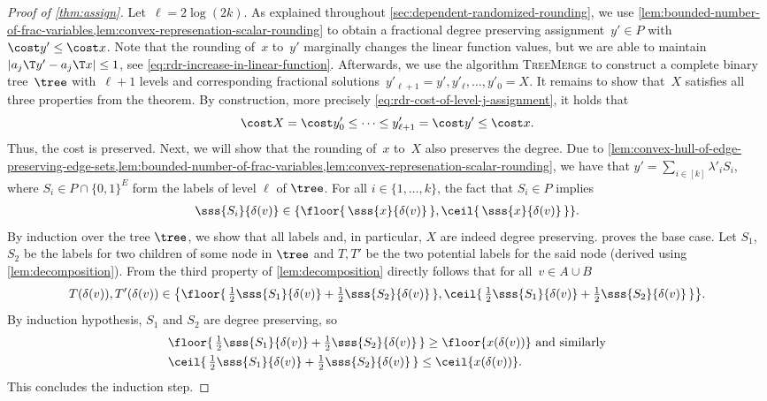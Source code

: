 \begin{proof}[Proof of \cref{thm:assign}]
    Let~$\ell = 2 \log (2k)$.
    As explained throughout \cref{sec:dependent-randomized-rounding}, we use \cref{lem:bounded-number-of-frac-variables,lem:convex-represenation-scalar-rounding} to obtain a fractional degree preserving assignment~$y'\in P$ with
    $\cost y'\le \cost x$.
    Note that the rounding of~$x$ to~$y'$ marginally changes the linear function values, but we are able to maintain~$|a_j\T y' - a_j\T x|\le 1$, see \cref{eq:rdr-increase-in-linear-function}.
    Afterwards, we use the algorithm \textsc{TreeMerge} to construct a complete binary tree~$\tree$ with~$\ell + 1$ levels
    and corresponding fractional solutions~$y'_{\ell+1} = y', y'_{\ell}, \dotsc, y'_0 = X$.
    It remains to show that~$X$ satisfies all three properties from the theorem.
    By construction, more precisely \cref{eq:rdr-cost-of-level-j-assignment}, it
    holds that
    \begin{equation*}
        \cost X = \cost y_0' \le \cdots \le y'_{\ell+1} = \cost y' \le \cost x.
    \end{equation*}
    Thus, the cost is preserved.
    Next, we will show that the rounding of~$x$ to~$X$ also preserves the degree.
    Due to \cref{lem:convex-hull-of-edge-preserving-edge-sets,lem:bounded-number-of-frac-variables,lem:convex-represenation-scalar-rounding},
    we have that $y' = \sum_{i \in [k]} \lambda'_i S_i$, where $S_i\in P\cap \{0,1\}^E$
    form the labels of level $\ell$ of $\tree$. For all $i\in\{1,\dotsc,k\}$,
    the fact that $S_i\in P$ implies
    \begin{align}
        \label{eq:rdr-degree-preservation}
        \sss{S_i}{\delta(v)} \in \{ \floor{\,\sss{x}{\delta(v)}\,}, \ceil{\, \sss{x}{\delta(v)}\,} \}.
    \end{align}
    By induction over the tree $\tree$, we show that all labels and, in particular, $X$ are indeed degree preserving.  proves the base case.
    Let $S_1$, $S_2$ be the labels for two children of some node in $\tree$
    and $T, T'$ be the two potential labels for the said node (derived using \cref{lem:decomposition}).
    From the third property of \cref{lem:decomposition} directly follows that for all~$v \in A \cup B$ 
    \begin{equation}
        \label{eq:rdr-degree-preservation-of-edge-decomposition}
        T(\delta(v)), T'(\delta(v))
        \in \big\{\floor{ \,\tfrac{1}{2}  \sss{S_{1}}{\delta(v)} + \tfrac{1}{2}\sss{S_{2}}{\delta(v)} \,}, \ceil{\,\tfrac{1}{2} \sss{S_{1}}{\delta(v)} + \tfrac{1}{2}\sss{S_{2}}{\delta(v)}\,} \big\}.
    \end{equation}
    By induction hypothesis, $S_1$ and $S_2$ are degree preserving, so
    \begin{align*}
        &\floor{ \,\tfrac{1}{2}  \sss{S_{1}}{\delta(v)} + \tfrac{1}{2}\sss{S_{2}}{\delta(v)} \,} \ge \floor{ x(\delta(v)) } \text{ and similarly} \\
        &\ceil{ \,\tfrac{1}{2}  \sss{S_{1}}{\delta(v)} + \tfrac{1}{2}\sss{S_{2}}{\delta(v)} \,} \le \ceil{ x(\delta(v)) } .
    \end{align*}
    This concludes the induction step.
    

\end{proof}
